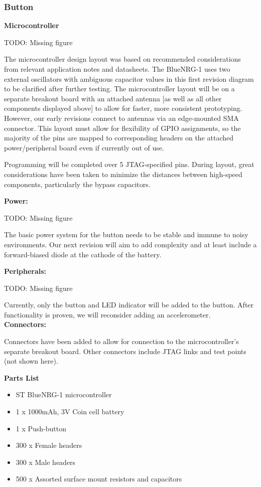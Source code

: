 \documentclass[journal,compsoc]{IEEEtran}
\begin{document}
\subsubsection{Button}

\textbf {Microcontroller}

TODO: Missing figure

The microcontroller design layout was based on recommended considerations from relevant application notes and datasheets.  The BlueNRG-1 uses two external oscillators with ambiguous capacitor values in this first revision diagram to be clarified after further testing.  The microcontroller layout will be on a separate breakout board with an attached antenna [as well as all other components displayed above] to allow for faster, more consistent prototyping.  However, our early revisions connect to antennas via an edge-mounted SMA connector.  This layout must allow for flexibility of GPIO assignments, so the majority of the pins are mapped to corresponding headers on the attached power/peripheral board even if currently out of use.

Programming will be completed over 5 JTAG-specified pins.  During layout, great considerations have been taken to minimize the distances between high-speed components, particularly the bypass capacitors.

\textbf {Power:}

TODO: Missing figure

The basic power system for the button needs to be stable and immune to noisy environments.  Our next revision will aim to add complexity and at least include a forward-biased diode at the cathode of the battery.

\textbf {Peripherals:}

TODO: Missing figure

Currently, only the button and LED indicator will be added to the button.  After functionality is proven, we will reconsider adding an accelerometer.\\

\textbf {Connectors:}

Connectors have been added to allow for connection to the microcontroller’s separate breakout board.  Other connectors include JTAG links and test points (not shown here).

\textbf {Parts List}

\begin{itemize}
  \item ST BlueNRG-1 microcontroller
  \item 1 x 1000mAh, 3V Coin cell battery
  \item 1 x Push-button
  \item 300 x Female headers
  \item 300 x Male headers
  \item 500 x Assorted surface mount resistors and capacitors
\end{itemize}
\end{document}
